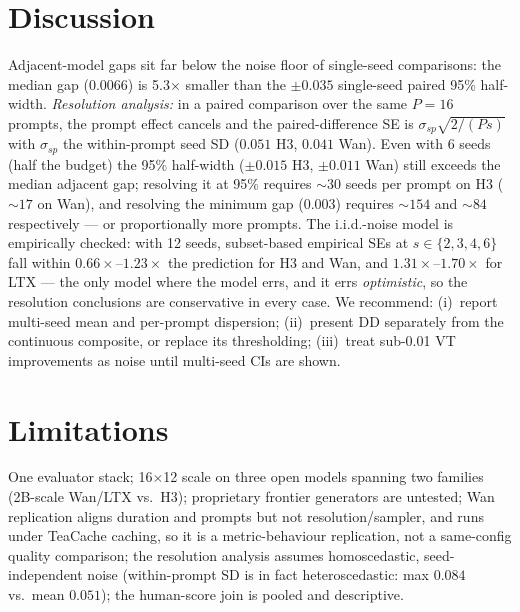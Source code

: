 \documentclass[10pt,twocolumn]{article}
\begin{document}
\section{Discussion}
Adjacent-model gaps sit far below the noise floor of single-seed
comparisons: the median gap ($0.0066$) is 5.3$\times$ smaller than the $\pm0.035$
single-seed paired 95\% half-width.
\emph{Resolution analysis:} in a paired comparison over the same $P{=}16$
prompts, the prompt effect cancels and the paired-difference SE is
$\sigma_{sp}\sqrt{2/(Ps)}$ with $\sigma_{sp}$ the within-prompt seed SD
($0.051$ H3, $0.041$ Wan). Even with 6 seeds (half the budget) the 95\% half-width
($\pm0.015$ H3, $\pm0.011$ Wan) still exceeds the median adjacent gap;
resolving it at 95\% requires ${\sim}30$ seeds per prompt on H3
(${\sim}17$ on Wan), and resolving the minimum gap ($0.003$) requires
${\sim}154$ and ${\sim}84$ respectively --- or proportionally more prompts.
The i.i.d.-noise model is empirically checked: with 12 seeds, subset-based
empirical SEs at $s{\in}\{2,3,4,6\}$ fall within $0.66\times$--$1.23\times$ the
prediction for H3 and Wan, and $1.31\times$--$1.70\times$ for LTX --- the only
model where the model errs, and it errs \emph{optimistic}, so the resolution
conclusions are conservative in every case.
We recommend: (i)~report
multi-seed mean and per-prompt dispersion; (ii)~present DD separately from the
continuous composite, or replace its thresholding; (iii)~treat
sub-0.01 VT improvements as noise until multi-seed CIs are shown.

\section{Limitations}
One evaluator stack; 16$\times$12 scale on three open models spanning two families (2B-scale
Wan/LTX vs.\ H3); proprietary frontier generators are untested; Wan replication aligns duration and prompts but not
resolution/sampler, and runs under TeaCache caching, so it is a
metric-behaviour replication, not a same-config quality comparison; the
resolution analysis assumes homoscedastic, seed-independent noise (within-prompt SD is in fact heteroscedastic: max $0.084$ vs.\ mean $0.051$); the
human-score join is pooled and descriptive.
\end{document}
